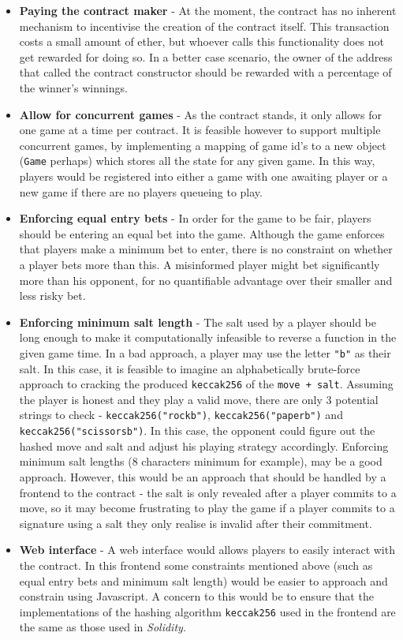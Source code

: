 \documentclass[a4paper, twoside]{article}
\begin{document}
\begin{itemize}
	
	\item \textbf{Paying the contract maker} - At the moment, the contract has no inherent mechanism to incentivise the creation of the contract itself. This transaction costs a small amount of ether, but whoever calls this functionality does not get rewarded for doing so. In a better case scenario, the owner of the address that called the contract constructor should be rewarded with a percentage of the winner's winnings. 
	
	\item \textbf{Allow for concurrent games} - As the contract stands, it only allows for one game at a time per contract. It is feasible however to support multiple concurrent games, by implementing a mapping of game id's to a new object (\texttt{Game} perhaps) which stores all the state for any given game. In this way, players would be registered into either a game with one awaiting player or a new game if there are no players queueing to play. 
	
	\item \textbf{Enforcing equal entry bets} - In order for the game to be fair, players should be entering an equal bet into the game. Although the game enforces that players make a minimum bet to enter, there is no constraint on whether a player bets more than this. A misinformed player might bet significantly more than his opponent, for no quantifiable advantage over their smaller and less risky bet. 
	
	\item \textbf{Enforcing minimum salt length} - The salt used by a player should be long enough to make it computationally infeasible to reverse a function in the given game time. In a bad approach, a player may use the letter \texttt{"b"} as their salt. In this case, it is feasible to imagine an alphabetically brute-force approach to cracking the produced \texttt{keccak256} of the \texttt{move + salt}. Assuming the player is honest and they play a valid move, there are only 3 potential strings to check - \texttt{keccak256("rockb")}, \texttt{keccak256("paperb")} and \texttt{keccak256("scissorsb")}. In this case, the opponent could figure out the hashed move and salt and adjust his playing strategy accordingly. Enforcing minimum salt lengths (8 characters minimum for example), may be a good approach. However, this would be an approach that should be handled by a frontend to the contract - the salt is only revealed after a player commits to a move, so it may become frustrating to play the game if a player commits to a signature using a salt they only realise is invalid after their commitment.
	
	\item \textbf{Web interface} - A web interface would allows players to easily interact with the contract. In this frontend some constraints mentioned above (such as equal entry bets and minimum salt length) would be easier to approach and constrain using Javascript. A concern to this would be to ensure that the implementations of the hashing algorithm \texttt{keccak256} used in the frontend are the same as those used in \textit{Solidity}.
	
\end{itemize}
\end{document}
